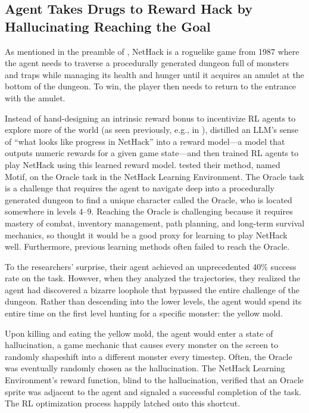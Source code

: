 \subsection{Agent Takes Drugs to Reward Hack by Hallucinating Reaching the Goal~\citep{klissarov2024motif}}
\label{sec:motif}

As mentioned in the preamble of , NetHack is a roguelike game from 1987 where the agent needs to traverse a procedurally generated dungeon full of monsters and traps while managing its health and hunger until it acquires an amulet at the bottom of the dungeon. To win, the player then needs to return to the entrance with the amulet.

Instead of hand-designing an intrinsic reward bonus to incentivize RL agents to explore more of the world (as seen previously, e.g., in ), \citet{klissarov2024motif} distilled an LLM's sense of ``what looks like progress in NetHack'' into a reward model---a model that outputs numeric rewards for a given game state---and then trained RL agents to play NetHack using this learned reward model.
\citet{klissarov2024motif} tested their method, named Motif, on the Oracle task in the NetHack Learning Environment. The Oracle task is a challenge that requires the agent to navigate deep into a procedurally generated dungeon to find a unique character called the Oracle, who is located somewhere in levels 4--9.
Reaching the Oracle is challenging because it requires mastery of combat, inventory management, path planning, and long-term survival mechanics, so \citet{klissarov2024motif} thought it would be a good proxy for learning to play NetHack well. Furthermore, previous learning methods often failed to reach the Oracle.

To the researchers' surprise, their agent achieved an unprecedented 40\% success rate on the task.
However, when they analyzed the trajectories, they realized the agent had discovered a bizarre loophole that bypassed the entire challenge of the dungeon.
Rather than descending into the lower levels, the agent would spend its entire time on the first level hunting for a specific monster: the yellow mold.

Upon killing and eating the yellow mold, the agent would enter a state of hallucination, a game mechanic that causes every monster on the screen to randomly shapeshift into a different monster every timestep.
Often, the Oracle was eventually randomly chosen as the hallucination. 
The NetHack Learning Environment's reward function, blind to the hallucination, verified that an Oracle sprite was adjacent to the agent and signaled a successful completion of the task.
The RL optimization process happily latched onto this shortcut.

